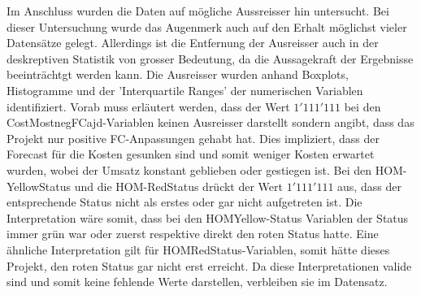 \newline Im Anschluss wurden die Daten auf mögliche Aussreisser hin untersucht. Bei dieser Untersuchung wurde das Augenmerk auch auf den Erhalt möglichst vieler Datensätze gelegt. Allerdings ist die Entfernung der Ausreisser auch in der deskreptiven Statistik von grosser Bedeutung, da die Aussagekraft der Ergebnisse beeinträchtgt werden kann. Die Ausreisser wurden anhand Boxplots, Histogramme und der 'Interquartile Ranges' der numerischen Variablen identifiziert. Vorab muss erläutert werden, dass der Wert $1'111'111$ bei den CostMostnegFCajd-Variablen keinen Ausreisser darstellt sondern angibt, dass das Projekt nur positive FC-Anpassungen gehabt hat. Dies impliziert, dass der Forecast für die Kosten gesunken sind und somit weniger Kosten erwartet wurden, wobei der Umsatz konstant geblieben oder gestiegen ist. Bei den HOM-YellowStatus und die HOM-RedStatus drückt der Wert $1'111'111$ aus, dass der entsprechende Status nicht als erstes oder gar nicht aufgetreten ist. Die Interpretation wäre somit, dass bei den HOMYellow-Status Variablen der Status immer grün war oder zuerst respektive direkt den roten Status hatte. Eine ähnliche Interpretation gilt für HOMRedStatus-Variablen, somit hätte dieses Projekt, den roten Status gar nicht erst erreicht. Da diese Interpretationen valide sind und somit keine fehlende Werte darstellen, verbleiben sie im Datensatz. 
\newline
